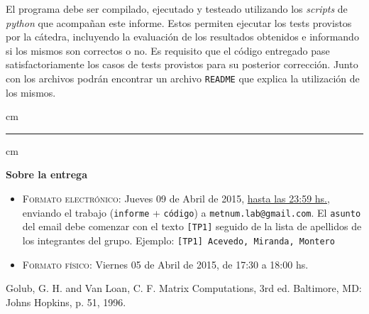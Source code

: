 El programa debe ser compilado, ejecutado y testeado utilizando los \emph{scripts} de \emph{python} que acompa\~nan este informe. Estos permiten ejecutar los tests provistos por la c\'atedra, incluyendo la evaluaci\'on de los resultados obtenidos e informando si los mismos son correctos o no. Es requisito que el c\'odigo entregado pase satisfactoriamente los casos de tests provistos para su posterior correcci\'on. Junto con los archivos podr\'an encontrar un archivo \texttt{README} que explica la utilizaci\'on de los mismos.

 cm
\hrule
{} cm

{\bf Sobre la entrega}
\begin{itemize}
\item \textsc{Formato electr\'onico:} Jueves 09 de Abril de 2015, \underline{hasta las 23:59 hs.}, enviando el trabajo
(\texttt{informe} + \texttt{c\'odigo}) a \texttt{metnum.lab@gmail.com}. El \texttt{asunto} del email debe comenzar con el texto \verb|[TP1]| seguido
de la lista de apellidos de los integrantes del grupo. Ejemplo: \texttt{[TP1] Acevedo, Miranda, Montero}
\item \textsc{Formato f\'isico:} Viernes 05 de Abril de 2015, de 17:30 a 18:00 hs.
\end{itemize}

\begin{thebibliography}{1}
	 Golub, G. H. and Van Loan, C. F. Matrix Computations, 3rd ed. Baltimore, MD: Johns Hopkins, p. 51, 1996.
\end{thebibliography}

